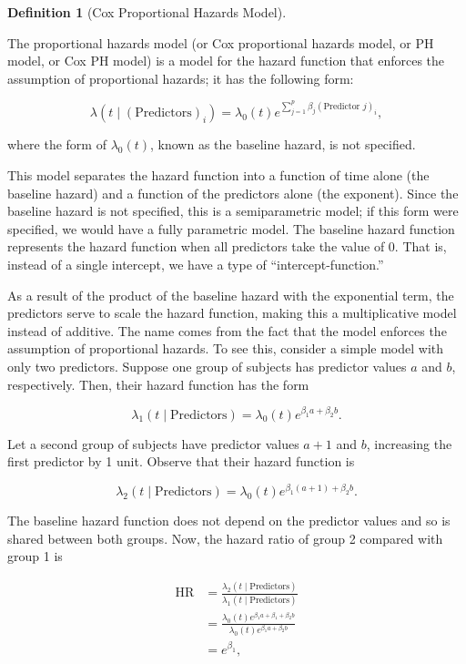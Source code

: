 \documentclass[
  letterpaper,
  DIV=11,
  numbers=noendperiod]{scrreprt}
\theoremstyle{definition}
\newtheorem{definition}{Definition}[chapter]
\theoremstyle{definition}
\theoremstyle{remark}
\begin{document}
\begin{definition}[Cox Proportional Hazards
Model]\protect\hypertarget{def-cph}{}\label{def-cph}

The proportional hazards model (or Cox proportional hazards model, or PH
model, or Cox PH model) is a model for the hazard function that enforces
the assumption of proportional hazards; it has the following form:

\[\lambda\left(t \mid (\text{Predictors})_i\right) = \lambda_0(t) e^{\sum\limits_{j=1}^{p} \beta_j (\text{Predictor } j)_i},\]

where the form of \(\lambda_0(t)\), known as the baseline hazard, is not
specified.

\end{definition}

This model separates the hazard function into a function of time alone
(the baseline hazard) and a function of the predictors alone (the
exponent). Since the baseline hazard is not specified, this is a
semiparametric model; if this form were specified, we would have a fully
parametric model. The baseline hazard function represents the hazard
function when all predictors take the value of 0. That is, instead of a
single intercept, we have a type of ``intercept-function.''

As a result of the product of the baseline hazard with the exponential
term, the predictors serve to scale the hazard function, making this a
multiplicative model instead of additive. The name comes from the fact
that the model enforces the assumption of proportional hazards. To see
this, consider a simple model with only two predictors. Suppose one
group of subjects has predictor values \(a\) and \(b\), respectively.
Then, their hazard function has the form

\[\lambda_1(t \mid \text{Predictors}) = \lambda_0(t) e^{\beta_1 a + \beta_2 b}.\]

Let a second group of subjects have predictor values \(a + 1\) and
\(b\), increasing the first predictor by 1 unit. Observe that their
hazard function is

\[\lambda_2(t \mid \text{Predictors}) = \lambda_0(t) e^{\beta_1 (a + 1) + \beta_2 b}.\]

The baseline hazard function does not depend on the predictor values and
so is shared between both groups. Now, the hazard ratio of group 2
compared with group 1 is

\[
\begin{aligned}
  \text{HR} &= \frac{\lambda_2(t \mid \text{Predictors})}{\lambda_1(t \mid \text{Predictors})} \\
    &= \frac{\lambda_0(t) e^{\beta_1 a + \beta_1 + \beta_2 b}}{\lambda_0(t) e^{\beta_1 a + \beta_2 b}} \\
    &= e^{\beta_1},
\end{aligned}
\]
\end{document}
